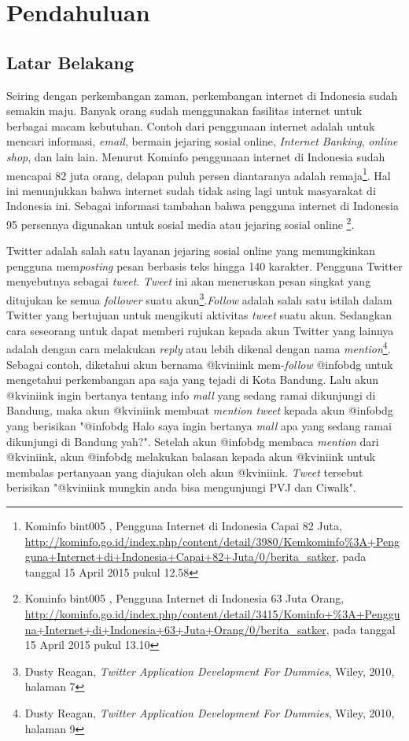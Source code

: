 \chapter{Pendahuluan}
\label{chap:pendahuluan}

\section{Latar Belakang}
\label{sec:latar belakang}

Seiring dengan perkembangan zaman, perkembangan internet di Indonesia sudah semakin maju.  Banyak orang sudah menggunakan fasilitas internet untuk berbagai macam kebutuhan. Contoh dari penggunaan internet adalah untuk mencari informasi, \textit{email}, bermain jejaring sosial online, \textit{Internet Banking}, \textit{online shop}, dan lain lain. Menurut Kominfo penggunaan internet di Indonesia sudah mencapai 82 juta orang, delapan puluh persen diantaranya adalah remaja\footnote{Kominfo bint005 , Pengguna Internet di Indonesia Capai 82 Juta, \url{http://kominfo.go.id/index.php/content/detail/3980/Kemkominfo\%3A+Pengguna+Internet+di+Indonesia+Capai+82+Juta/0/berita_satker}, pada tanggal 15 April 2015 pukul 12.58}. Hal ini menunjukkan bahwa internet sudah tidak asing lagi untuk masyarakat di Indonesia ini. Sebagai informasi tambahan bahwa pengguna internet di Indonesia 95 persennya digunakan untuk sosial media atau jejaring sosial online \footnote{Kominfo bint005 , Pengguna Internet di Indonesia 63 Juta Orang, \url{http://kominfo.go.id/index.php/content/detail/3415/Kominfo+\%3A+Pengguna+Internet+di+Indonesia+63+Juta+Orang/0/berita_satker}, pada tanggal 15 April 2015 pukul 13.10}.

Twitter adalah salah satu layanan jejaring sosial online yang memungkinkan pengguna mem\textit{posting} pesan berbasis teks hingga 140 karakter. Pengguna Twitter menyebutnya sebagai \textit{tweet}. \textit{Tweet} ini akan meneruskan pesan singkat yang ditujukan ke semua \textit{follower} suatu akun\footnote{Dusty Reagan, \textit{Twitter Application Development For Dummies}, Wiley, 2010, halaman 7}.\textit{Follow} adalah salah satu istilah dalam Twitter yang bertujuan untuk mengikuti aktivitas \textit{tweet} suatu akun. Sedangkan cara seseorang untuk dapat memberi rujukan kepada akun Twitter yang lainnya adalah dengan cara melakukan \textit{reply} atau lebih dikenal dengan nama \textit{mention}\footnote{Dusty Reagan, \textit{Twitter Application Development For Dummies}, Wiley, 2010, halaman 9}. Sebagai contoh, diketahui akun bernama @kviniink mem-\textit{follow} @infobdg untuk mengetahui perkembangan apa saja yang tejadi di Kota Bandung. Lalu akun @kviniink ingin bertanya tentang info \textit{mall} yang sedang ramai dikunjungi di Bandung, maka akun @kviniink membuat \textit{mention tweet} kepada akun @infobdg yang berisikan "@infobdg Halo saya ingin bertanya \textit{mall} apa yang sedang ramai dikunjungi di Bandung yah?". Setelah akun @infobdg membaca \textit{mention} dari @kviniink, akun @infobdg melakukan balasan kepada akun @kviniink untuk membalas pertanyaan yang diajukan oleh akun @kviniink. \textit{Tweet} tersebut berisikan "@kviniink mungkin anda bisa mengunjungi PVJ dan Ciwalk".

